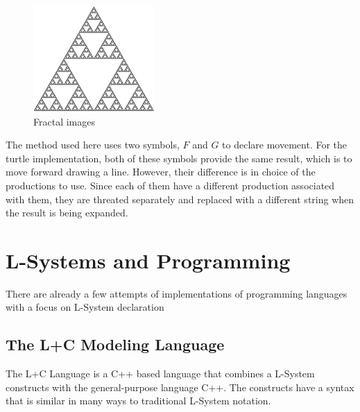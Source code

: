 \documentclass{acmtog}
\begin{document}
\begin{figure}[!htp]
  \begin{center}
    \includegraphics[width=0.8\columnwidth]{images/6_sierpinski}
    \caption{Fractal images \label{fig:Sierpinski Triangle}}
    \end{center}
\end{figure}

The method used here uses two symbols, $F$ and $G$ to declare movement. For the turtle implementation, both of these symbols provide the same result, which is to move forward drawing a line. However, their difference is in choice of the productions to use. Since each of them have a different production associated with them, they are threated separately and replaced with a different string when the result is being expanded.

\section{L-Systems and Programming}
\label{sec:languages}

There are already a few attempts of implementations of programming languages with a focus on L-System declaration

\subsection{The L+C Modeling Language}
\label{subsec:lc_language}

The L+C Language \cite{karwowski2003design} is a C++ based language that combines a L-System constructs with the general-purpose language C++. The constructs have a syntax that is similar in many ways to traditional L-System notation.
\end{document}
